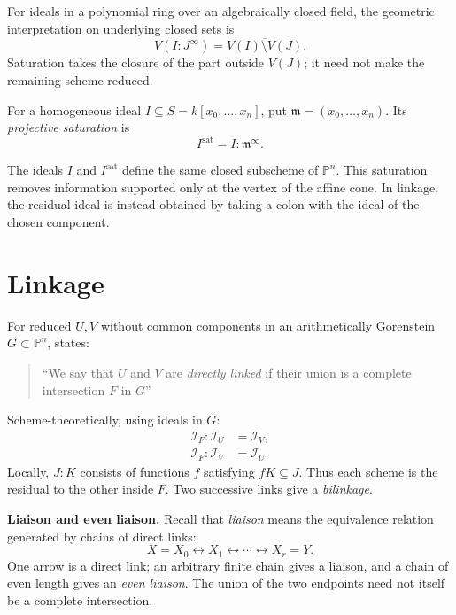 For ideals in a polynomial ring over an
algebraically closed field, the geometric
interpretation on underlying closed sets
is
$$
V(I:J^\infty)
=\overline{V(I)\setminus V(J)}.
$$
Saturation takes the closure of the part
outside $V(J)$; it need not make the
remaining scheme reduced.

\begin{definition}
\label{definition-projective-saturation}
For a homogeneous ideal
$I\subseteq S=k[x_0,\ldots,x_n]$, put
$\mathfrak m=(x_0,\ldots,x_n)$.
Its \textit{projective saturation} is
$$
I^{\mathrm{sat}}=I:\mathfrak m^\infty.
$$
\end{definition}

The ideals $I$ and $I^{\mathrm{sat}}$
define the same closed subscheme of
$\mathbb{P}^n$. This saturation removes
information supported only at the vertex
of the affine cone. In linkage, the
residual ideal is instead obtained by
taking a colon with the ideal of the
chosen component.

\section{Linkage}
\label{section-linkage}

\begin{definition}
\label{definition-direct-linkage}
For reduced $U,V$ without common
components in an arithmetically
Gorenstein $G\subset\mathbb{P}^n$,
\cite[Section 2.2]{luk2} states:
\begin{quote}
``We say that $U$ and $V$ are
\textit{directly linked} if their union
is a complete intersection $F$ in $G$''
\end{quote}
Scheme-theoretically, using ideals in $G$:
$$
\begin{aligned}
\mathcal{I}_F:\mathcal{I}_U
&=\mathcal{I}_V,\\
\mathcal{I}_F:\mathcal{I}_V
&=\mathcal{I}_U.
\end{aligned}
$$
Locally, $J:K$ consists of functions $f$
satisfying $fK\subseteq J$.
Thus each scheme is the residual
to the other inside $F$.
Two successive links give a
\textit{bilinkage}.
\end{definition}

\medskip\noindent
\textbf{Liaison and even liaison.}
Recall that \emph{liaison} means the
equivalence relation generated by chains
of direct links:
$$
X=X_0\longleftrightarrow X_1
\longleftrightarrow\cdots
\longleftrightarrow X_r=Y.
$$
One arrow is a direct link; an arbitrary
finite chain gives a liaison, and a chain
of even length gives an \emph{even liaison}.
The union of the two endpoints need not
itself be a complete intersection.

